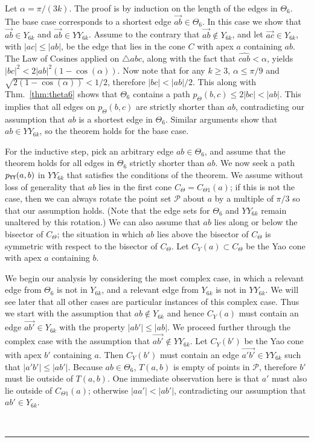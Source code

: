 \documentclass[11pt]{article}
\newcommand\cone{{C}}
\newcommand\Pt{\mathcal P}
\newcommand\pyy{p_{{\tt YY}}}
\newcommand\ang[1]{\widehat{#1}}
\newcommand{\arr}[1]{\overrightarrow{#1}}
\newcommand{\qed}{\rule{0.5em}{1.5ex}}
\newcommand{\fqed}{{\hfill~\qed}}
\newenvironment{proof}{{\noindent \bf Proof.}}
                      {{\hfill \fqed} \vspace{1em}}
\begin{document}
\begin{proof}
Let $\alpha = \pi/(3k)$. The proof is by induction on the length of the edges in $\Theta_6$. The base case corresponds to a shortest edge $\arr{ab} \in \Theta_6$.
In this case we show that $\arr{ab} \in Y_{6k}$ and $\arr{ab} \in YY_{6k}$. Assume to the contrary that
$\arr{ab} \not\in Y_{6k}$, and let $\arr{ac} \in Y_{6k}$, with $|ac| \le |ab|$, be the edge that lies in the cone $\cone$ with apex $a$ containing $ab$. The Law of Cosines applied on $\triangle abc$, along with the fact that $\ang{cab} < \alpha$, yields $|bc|^2 < 2|ab|^2(1-\cos(\alpha))$. Now note that for any $k \ge 3$, $\alpha \le \pi/9$ and $\sqrt{2(1-\cos(\alpha))} < 1/2$, therefore $|bc| < |ab|/2$. This along with Thm.~\ref{thm:theta6} shows that $\Theta_6$ contains a path $p_\Theta(b,c) \le 2|bc| < |ab|$. This implies that all edges on $p_\Theta(b,c)$ are strictly shorter than $ab$, contradicting our assumption that $ab$ is a shortest edge in $\Theta_6$. Similar arguments show that $ab \in YY_{6k}$, so the theorem holds for the base case.


For the inductive step, pick an arbitrary edge $ab \in \Theta_6$, and assume that the theorem holds for all edges in $\Theta_6$ strictly shorter than $ab$. We now seek a path $\pyy(a, b)$ in $YY_{6k}$ that satisfies the conditions of the theorem. We assume without loss of generality that $ab$ lies in the first cone $\cone_\Theta = \cone_{\Theta1}(a)$; if this is not the case, then we can always rotate the point set $\Pt$ about $a$ by a multiple of $\pi/3$ so that our assumption holds. (Note that the edge sets for $\Theta_6$ and $YY_{6k}$ remain unaltered by this rotation.) We can also assume that $ab$ lies along or below the bisector of $\cone_\Theta$; the situation in which $ab$ lies above the bisector of $\cone_\Theta$ is symmetric with respect to the bisector of $\cone_\Theta$.
Let $\cone_Y(a) \subset \cone_\Theta$ be the Yao cone with apex $a$ containing $b$.

We begin our analysis by considering the most complex case, in which a relevant edge from $\Theta_6$ is not in $Y_{6k}$, and a relevant edge from $Y_{6k}$ is not in $YY_{6k}$. We will see later that all other cases are particular instances of this complex case. Thus we start with the assumption that $ab \not\in Y_{6k}$ and hence $\cone_Y(a)$ must contain an edge $\arr{ab'} \in Y_{6k}$ with the property $|ab'| \le |ab|$. We proceed further through the complex case with the assumption that $\arr{ab'} \not\in YY_{6k}$. Let $\cone_Y(b')$ be the Yao cone with apex $b'$ containing $a$. Then $\cone_Y(b')$ must contain an edge $\arr{a'b'} \in YY_{6k}$ such that $|a'b'| \le |ab'|$. Because $ab \in \Theta_6$, $T(a, b)$ is empty of points in $\Pt$, therefore $b'$ must lie outside of $T(a,b)$. One immediate observation here is that $a'$ must also lie outside of $C_{\Theta1}(a)$; otherwise $|aa'| < |ab'|$, contradicting our assumption that $ab' \in Y_{6k}$.


\end{proof}
\end{document}
